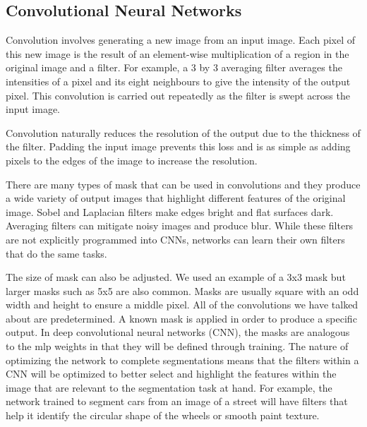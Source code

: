 \documentclass[12pt]{article}
\begin{document}
\subsection{Convolutional Neural Networks}
Convolution involves generating a new image from an input image. Each pixel of this new image is the result of an element-wise multiplication of a region in the original image and a filter.
For example, a 3 by 3 averaging filter averages the intensities of a pixel and its eight neighbours to give the intensity of the output pixel.
This convolution is carried out repeatedly as the filter is swept across the input image.
\par
Convolution naturally reduces the resolution of the output due to the thickness of the filter.
Padding the input image prevents this loss and is as simple as adding pixels to the edges of the image to increase the resolution.
\par 
There are many types of mask that can be used in convolutions and they produce a wide variety of output images that highlight different features of the original image.
Sobel and Laplacian filters make edges bright and flat surfaces dark. Averaging filters can mitigate noisy images and produce blur.
While these filters are not explicitly programmed into CNNs, networks can learn their own filters that do the same tasks.
\par 
The size of mask can also be adjusted. We used an example of a 3x3 mask but larger masks such as 5x5 are also common.
Masks are usually square with an odd width and height to ensure a middle pixel. All of the convolutions we have talked about are predetermined.
A known mask is applied in order to produce a specific output. In deep convolutional neural networks (CNN), the masks are analogous to the mlp weights in that they will be defined through training.
The nature of optimizing the network to complete segmentations means that the filters within a CNN  will be optimized to better select and highlight the features within the image that are relevant to the segmentation task at hand.
For example, the network trained to segment cars from an image of a street will have filters that help it identify the circular shape of the wheels or smooth paint texture.
\end{document}
